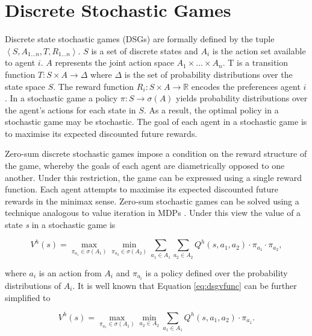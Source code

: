 \section{Discrete Stochastic Games}
\label{sec:dsg}

Discrete state stochastic games (DSGs) are formally defined by the tuple \\
$ \left\langle S, A_{1 \ldots n}, T, R_{1 \ldots n} \right\rangle $.
$S$ is a set of discrete states and $A_i$ is the action set available to agent $i$. 
$A$ represents the joint action space 
$ A_1 \times \ldots \times A_n $. T is a transition function 
$T : S \times A \rightarrow \Delta$ where $\Delta$ is the set of 
probability distributions over the state space $S$. The reward function
$R_i : S \times A \rightarrow \mathbb{R}$ encodes the preferences
agent $i$. In a stochastic game a policy $\pi : S \rightarrow \sigma(A)$ 
yields probability
distributions over the agent's actions for each state in $S$. As a result,
the optimal policy in a stochastic game may be stochastic. The goal of 
each agent in a stochastic game is to maximise its expected 
discounted future rewards.

Zero-sum discrete stochastic games impose a condition on the reward
structure of the game, whereby the goals of each agent are diametrically
opposed to one another. Under this restriction, the game can be expressed
using a single reward function. Each agent attempts to 
maximise its expected discounted future rewards in the minimax sense.
Zero-sum stochastic games can be solved using a technique analogous
to value iteration in MDPs \cite{Littman_ICML_1994}. Under this view
the value of a state \emph{s} in a stochastic game is 

\begin{equation}
\label{eq:dsgvfunc}
  V^{h}(s) = \max_{\pi_{a_1} \in \sigma(A_1)}\min_{\pi_{a_2} \in \sigma(A_2)} \sum_{a_1 \in A_1} \sum_{a_2 \in A_2} Q^{h}(s, a_1, a_2) \cdot \pi_{a_1} \cdot \pi_{a_2},
\end{equation}

where $a_i$ is an action from $A_i$ and $\pi_{a_i}$ is a policy defined 
over the probability distributions of $A_i$.  It is well known that 
Equation \ref{eq:dsgvfunc} can be further simplified to

\begin{equation}
\label{eq:dsgvfunccompact}
  V^{h}(s) = \max_{\pi_{a_1} \in \sigma(A_1)} \min_{a_2 \in A_2} \sum_{a_1 \in A_1} Q^{h}(s, a_1, a_2) \cdot \pi_{a_1}.
\end{equation}

